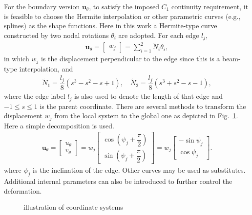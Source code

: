 \documentclass[3p,sort&compress,review,11pt]{elsarticle}
\newcommand*{\figref}[1]{Fig.~\ref{#1}}
\newcommand*{\mb}{\bm}
\begin{document}
For the boundary version $\mb{u}_\theta$, to satisfy the imposed $C_1$ continuity requirement, it is feasible to choose the Hermite interpolation or other parametric curves (e.g., splines) as the shape functions. Here in this work a Hermite-type curve constructed by two nodal rotations $\theta_i$ are adopted. For each edge $l_j$,
\begin{gather*}
\mb{u}_\theta=\begin{bmatrix}w_j\end{bmatrix}=\sum_{i=1}^{2}\tilde{N}_i\theta_i,
\end{gather*}
in which $w_j$ is the displacement perpendicular to the edge since this is a beam-type interpolation, and
\begin{gather*}
\tilde{N}_1=\dfrac{l_j}{8}\left(s^3-s^2-s+1\right),\quad
\tilde{N}_2=\dfrac{l_j}{8}\left(s^3+s^2-s-1\right),
\end{gather*}
where the edge label $l_j$ is also used to denote the length of that edge and $-1\leqslant{}s\leqslant1$ is the parent coordinate. There are several methods to transform the displacement $w_j$ from the local system to the global one as depicted in \figref{fig:coordinate_system}. Here a simple decomposition is used.
\begin{gather}
\mb{u}_\theta=\begin{bmatrix}u_\theta\\v_\theta\end{bmatrix}=w_j\begin{bmatrix}\cos\left(\psi_j+\dfrac{\pi}{2}\right)\\[2mm]\sin\left(\psi_j+\dfrac{\pi}{2}\right)\end{bmatrix}=w_j\begin{bmatrix}-\sin\psi_j\\[2mm]\cos\psi_j\end{bmatrix}.
\end{gather}
where $\psi_j$ is the inclination of the edge. Other curves may be used as substitutes. Additional internal parameters can also be introduced to further control the deformation.
\begin{figure}[H]
\centering\scriptsize
{}
\caption{illustration of coordinate systems}\label{fig:coordinate_system}
\end{figure}
\end{document}

